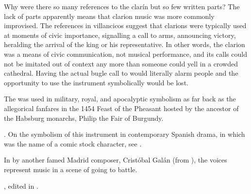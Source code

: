 Why were there so many references to the clarín but so few written parts?
The lack of parts apparently means that clarion music was more commonly
improvised.  
The references in villancicos suggest that clarions were typically used at
moments of civic importance, signalling a call to arms, announcing victory,
heralding the arrival of the king or his representative.
In other words, the clarion was a means of civic communication, not musical
performance, and its calls could not be imitated out of context any more than
someone could yell  in a crowded cathedral.
Having the actual bugle call to would literally alarm people and the
opportunity to use the instrument symbolically would be lost.

The  was used in military, royal, and apocalyptic symbolism as far
back as the allegorical  fanfares in the 1454 Feast of the
Pheasant hosted by the ancestor of the Habsburg monarchs, Philip the Fair of
Burgundy.%
\begin{Footnote}
    \Autocites
    [340--380]{LaMarche:Memoires}
    {Bloxam:JNV}
    {Perkins:Patronage15C}.
    On the symbolism of this instrument in contemporary Spanish drama, in which
     was the name of a comic stock character, see
    \autocite{Damjanovic:Clarin}.
\end{Footnote}
In  by another famed Madrid composer, Cristóbal
Galán (from ), the voices represent  music in a scene
of  going to battle.%
\begin{Footnote} 
    , 
    edited in \autocite[555--565]{CaberoPueyo:PhD}.
\end{Footnote}

